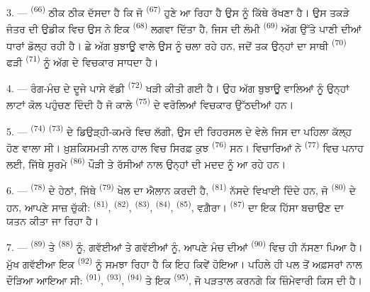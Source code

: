 3. ---  \textsuperscript{(66)} ਠੀਕ ਠੀਕ ਦੱਸਦਾ ਹੈ ਕਿ ਜੋ
 \textsuperscript{(67)} ਹੁਣੇ ਆ ਰਿਹਾ ਹੈ ਉਸ ਨੂੰ ਕਿੱਥੇ ਰੱਖਣਾ ਹੈ।
ਉਸ ਤਕੜੇ ਜੰਤਰ ਦੀ ਉਡੀਕ ਵਿਚ ਉਸ ਨੇ ਇਕ  \textsuperscript{(68)}
ਲਗਵਾ ਦਿੱਤਾ ਹੈ, ਜਿਸ ਦੀ ਲੰਮੀ  \textsuperscript{(69)} ਅੱਗ ਉੱਤੇ ਪਾਣੀ ਦੀਆਂ
ਧਾਰਾਂ ਡੋਲ੍ਹ ਰਹੀ ਹੈ। ਛੇ ਅੱਗ ਬੁਝਾਊ ਵਾਲੇ ਉਸ ਨੂੰ ਚਲਾ ਰਹੇ ਹਨ, ਜਦੋਂ ਤਕ ਉਨ੍ਹਾਂ ਦਾ ਸਾਥੀ
 \textsuperscript{(70)} ਫੜੀ  \textsuperscript{(71)} ਨੂੰ ਅੱਗ ਦੇ
ਵਿਚਕਾਰ ਸਾਧਦਾ ਹੈ।

4. --- ਰੰਗ-ਮੰਚ ਦੇ ਦੂਜੇ ਪਾਸੇ ਵੱਡੀ  \textsuperscript{(72)} ਖੜੀ ਕੀਤੀ ਗਈ
ਹੈ। ਉਹ ਅੱਗ ਬੁਝਾਊ ਵਾਲਿਆਂ ਨੂੰ ਉਨ੍ਹਾਂ ਲਾਟਾਂ ਕੋਲ ਪਹੁੰਚਣ ਦਿੰਦੀ ਹੈ ਜੋ ਕਾਲੇ
 \textsuperscript{(75)} ਦੇ ਵਰੋਲਿਆਂ ਵਿਚਕਾਰ ਉੱਠਦੀਆਂ ਹਨ।

\VUsaut{5.0mm}
\VUsaut{3.4mm}

5. ---  \textsuperscript{(74)}  \textsuperscript{(73)}
ਦੇ ਡਿਉੜ੍ਹੀ-ਕਮਰੇ ਵਿਚ ਲੱਗੀ, ਉਸ  ਦੀ ਰਿਹਰਸਲ ਦੇ ਵੇਲੇ ਜਿਸ ਦਾ ਪਹਿਲਾ
 ਕੱਲ੍ਹ ਹੋਣ ਵਾਲਾ ਸੀ। ਖ਼ੁਸ਼ਕਿਸਮਤੀ ਨਾਲ ਹਾਲ ਵਿਚ ਸਿਰਫ਼ ਕੁਝ
 \textsuperscript{(76)} ਸਨ। ਵਿਚਾਰਿਆਂ ਨੇ 
\textsuperscript{(77)} ਵਿਚ ਪਨਾਹ ਲਈ, ਜਿੱਥੇ ਸੂਰਮੇ 
\textsuperscript{(86)} ਪੌੜੀ ਤੇ ਰੱਸੀਆਂ ਨਾਲ ਉਨ੍ਹਾਂ ਦੀ ਮਦਦ ਨੂੰ ਆ ਰਹੇ ਹਨ।

6. ---  \textsuperscript{(78)} ਦੇ ਹੇਠਾਂ, ਜਿੱਥੇ
 \textsuperscript{(79)} ਖੇਲ ਦਾ ਐਲਾਨ ਕਰਦੀ ਹੈ,
 \textsuperscript{(81)} ਨੱਸਦੇ ਵਿਖਾਈ ਦਿੰਦੇ ਹਨ, ਜੋ
 \textsuperscript{(80)} ਦੇ ਹਨ, ਆਪਣੇ ਸਾਜ਼ ਚੁੱਕੀ:
 \textsuperscript{(81)},  \textsuperscript{(82)},
 \textsuperscript{(83)},  \textsuperscript{(84)},
 \textsuperscript{(85)}, ਵਗ਼ੈਰਾ। 
\textsuperscript{(87)} ਦਾ ਇਕ ਹਿੱਸਾ ਬਚਾਉਣ ਦਾ ਯਤਨ ਕੀਤਾ ਜਾ ਰਿਹਾ ਹੈ।

7. ---  \textsuperscript{(89)} ਤੇ 
\textsuperscript{(88)} ਨੂੰ, ਗਵੱਈਆਂ ਤੇ ਗਵੱਈਆਂ ਨੂੰ, ਆਪਣੇ ਮੰਚ ਦੀਆਂ 
\textsuperscript{(90)} ਵਿਚ ਹੀ ਨੱਸਣਾ ਪਿਆ ਹੈ। ਮੁੱਖ ਗਵੱਈਆ ਇਕ 
\textsuperscript{(92)} ਨੂੰ ਸਮਝਾ ਰਿਹਾ ਹੈ ਕਿ ਇਹ ਕਿਵੇਂ ਹੋਇਆ।  ਪਹਿਲੇ
ਹੀ ਪਲ ਤੋਂ ਅਫ਼ਸਰਾਂ ਨਾਲ ਦੌੜਿਆ ਆਇਆ ਸੀ:  \textsuperscript{(91)},
 \textsuperscript{(93)}, 
\textsuperscript{(94)} ਤੇ ਇਕ  \textsuperscript{(95)}, ਜੋ ਪੜਤਾਲ ਕਰਨਗੇ ਕਿ
ਜ਼ਿੰਮੇਵਾਰੀ ਕਿਸ ਦੀ ਹੈ।
\VUsaut{6.0mm}
\VUfilet{22mm}
